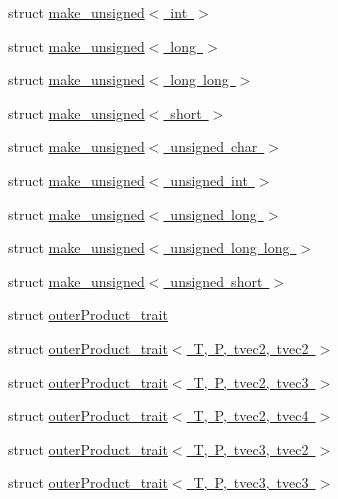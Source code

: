 \begin{DoxyCompactItemize}
\item 
struct \mbox{\hyperlink{structglm_1_1detail_1_1make__unsigned_3_01int_01_4}{make\+\_\+unsigned$<$ int $>$}}
\item 
struct \mbox{\hyperlink{structglm_1_1detail_1_1make__unsigned_3_01long_01_4}{make\+\_\+unsigned$<$ long $>$}}
\item 
struct \mbox{\hyperlink{structglm_1_1detail_1_1make__unsigned_3_01long_01long_01_4}{make\+\_\+unsigned$<$ long long $>$}}
\item 
struct \mbox{\hyperlink{structglm_1_1detail_1_1make__unsigned_3_01short_01_4}{make\+\_\+unsigned$<$ short $>$}}
\item 
struct \mbox{\hyperlink{structglm_1_1detail_1_1make__unsigned_3_01unsigned_01char_01_4}{make\+\_\+unsigned$<$ unsigned char $>$}}
\item 
struct \mbox{\hyperlink{structglm_1_1detail_1_1make__unsigned_3_01unsigned_01int_01_4}{make\+\_\+unsigned$<$ unsigned int $>$}}
\item 
struct \mbox{\hyperlink{structglm_1_1detail_1_1make__unsigned_3_01unsigned_01long_01_4}{make\+\_\+unsigned$<$ unsigned long $>$}}
\item 
struct \mbox{\hyperlink{structglm_1_1detail_1_1make__unsigned_3_01unsigned_01long_01long_01_4}{make\+\_\+unsigned$<$ unsigned long long $>$}}
\item 
struct \mbox{\hyperlink{structglm_1_1detail_1_1make__unsigned_3_01unsigned_01short_01_4}{make\+\_\+unsigned$<$ unsigned short $>$}}
\item 
struct \mbox{\hyperlink{structglm_1_1detail_1_1outer_product__trait}{outer\+Product\+\_\+trait}}
\item 
struct \mbox{\hyperlink{structglm_1_1detail_1_1outer_product__trait_3_01_t_00_01_p_00_01tvec2_00_01tvec2_01_4}{outer\+Product\+\_\+trait$<$ T, P, tvec2, tvec2 $>$}}
\item 
struct \mbox{\hyperlink{structglm_1_1detail_1_1outer_product__trait_3_01_t_00_01_p_00_01tvec2_00_01tvec3_01_4}{outer\+Product\+\_\+trait$<$ T, P, tvec2, tvec3 $>$}}
\item 
struct \mbox{\hyperlink{structglm_1_1detail_1_1outer_product__trait_3_01_t_00_01_p_00_01tvec2_00_01tvec4_01_4}{outer\+Product\+\_\+trait$<$ T, P, tvec2, tvec4 $>$}}
\item 
struct \mbox{\hyperlink{structglm_1_1detail_1_1outer_product__trait_3_01_t_00_01_p_00_01tvec3_00_01tvec2_01_4}{outer\+Product\+\_\+trait$<$ T, P, tvec3, tvec2 $>$}}
\item 
struct \mbox{\hyperlink{structglm_1_1detail_1_1outer_product__trait_3_01_t_00_01_p_00_01tvec3_00_01tvec3_01_4}{outer\+Product\+\_\+trait$<$ T, P, tvec3, tvec3 $>$}}

\end{DoxyCompactItemize}
